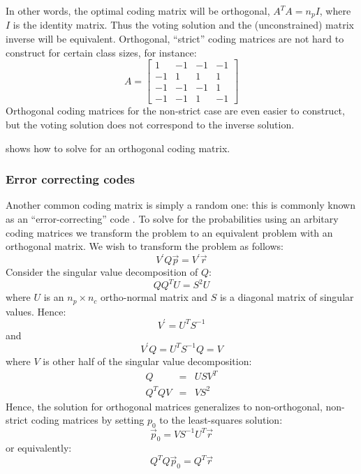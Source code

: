 \documentclass{article}
\begin{document}
In other words, 
the optimal coding matrix will be orthogonal, $A^T A = n_p I$, where $I$ is
the identity matrix. Thus the voting solution and the (unconstrained) matrix 
inverse will be equivalent. Orthogonal, ``strict'' coding matrices 
are not hard to construct for certain class sizes, for instance:
\begin{equation}
A = 
\begin{bmatrix}
1 & -1 & -1 & -1 \\
-1 & 1 & 1 & 1 \\
-1 & -1 & -1 & 1 \\
-1 & -1 & 1 & -1
\end{bmatrix}
\end{equation}
Orthogonal coding matrices for the non-strict case are even easier to
construct, but the voting solution does not correspond to the inverse solution.

\citet{Mills2017} shows how to solve for an orthogonal coding matrix.

\subsubsection{Error correcting codes}

Another common coding matrix is simply a random one: this is commonly
known as an ``error-correcting'' code \citep{Dietterich_Bakiri1995}.
To solve for the probabilities using an arbitary coding matrices
we transform the problem to an equivalent problem with an orthogonal
matrix.
We wish to transform the problem as follows:
\begin{equation}
	V^\prime Q \vec p = V^\prime \vec r
\end{equation}
Consider the singular value decomposition of $Q$:
\begin{equation}
	Q Q^T U = S^2 U
\end{equation}
where $U$ is an $n_p \times n_c$ ortho-normal matrix and $S$ is a diagonal
matrix of singular values.
Hence:
\begin{equation}
	V^\prime = U^T S^{-1}
\end{equation}
and
\begin{equation}
	V^\prime Q = U^T S^{-1} Q = V
\end{equation}
where $V$ is other half of the singular value decomposition:
\begin{eqnarray}
	Q & = & U S V^T \\
	Q^T Q V & = & V S^2
\end{eqnarray}
Hence, the solution for orthogonal matrices generalizes to non-orthogonal, 
non-strict coding matrices by setting $p_0$ to the least-squares solution:
\begin{equation}
	\vec p_0 = V S^{-1} U^T \vec r
\end{equation}
or equivalently:
\begin{equation}
	Q^T Q \vec p_0 = Q^T \vec r
\end{equation}
\end{document}
